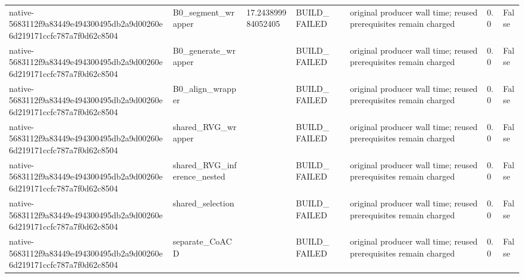 \begin{tabular}{llllllll}
native-5683112f9a83449e494300495db2a9d00260e6d219171ccfc787a7f0d62c8504 & B0\_segment\_wrapper & 17.243899984052405 & BUILD\_FAILED &  & original producer wall time; reused prerequisites remain charged & 0.0 & False \\
native-5683112f9a83449e494300495db2a9d00260e6d219171ccfc787a7f0d62c8504 & B0\_generate\_wrapper &  & BUILD\_FAILED &  & original producer wall time; reused prerequisites remain charged & 0.0 & False \\
native-5683112f9a83449e494300495db2a9d00260e6d219171ccfc787a7f0d62c8504 & B0\_align\_wrapper &  & BUILD\_FAILED &  & original producer wall time; reused prerequisites remain charged & 0.0 & False \\
native-5683112f9a83449e494300495db2a9d00260e6d219171ccfc787a7f0d62c8504 & shared\_RVG\_wrapper &  & BUILD\_FAILED &  & original producer wall time; reused prerequisites remain charged & 0.0 & False \\
native-5683112f9a83449e494300495db2a9d00260e6d219171ccfc787a7f0d62c8504 & shared\_RVG\_inference\_nested &  & BUILD\_FAILED &  & original producer wall time; reused prerequisites remain charged & 0.0 & False \\
native-5683112f9a83449e494300495db2a9d00260e6d219171ccfc787a7f0d62c8504 & shared\_selection &  & BUILD\_FAILED &  & original producer wall time; reused prerequisites remain charged & 0.0 & False \\
native-5683112f9a83449e494300495db2a9d00260e6d219171ccfc787a7f0d62c8504 & separate\_CoACD &  & BUILD\_FAILED &  & original producer wall time; reused prerequisites remain charged & 0.0 & False \\
\end{tabular}
